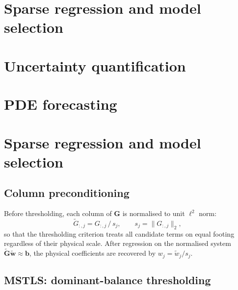 \documentclass{report}
\theoremstyle{plain}
\theoremstyle{remark}
\numberwithin{equation}{section}              %
\def\feedbackdraft{1}
\begin{document}
%
\ifdefined\feedbackdraft
\section{Sparse regression and model selection}
\label{sec:regression}

\section{Uncertainty quantification}
\label{sec:uq}

\section{PDE forecasting}
\label{sec:forecast}
\else
\section{Sparse regression and model selection}
\label{sec:regression}

\subsection{Column preconditioning}
\label{subsec:precondition}

Before thresholding, each column of $\mathbf{G}$ is normalised to unit
$\ell^2$ norm:
\begin{equation}
  \tilde{G}_{:,j} = G_{:,j}\,/\,s_j,
  \qquad
  s_j = \lVert G_{:,j}\rVert_2,
  \label{eq:precondition}
\end{equation}
so that the thresholding criterion treats all candidate terms on equal
footing regardless of their physical scale.  After regression on the
normalised system $\tilde{\mathbf{G}}\tilde{\mathbf{w}}\approx\mathbf{b}$,
the physical coefficients are recovered by $w_j = \tilde{w}_j/s_j$.

\subsection{MSTLS: dominant-balance thresholding}
\label{subsec:mstls}
\end{document}
